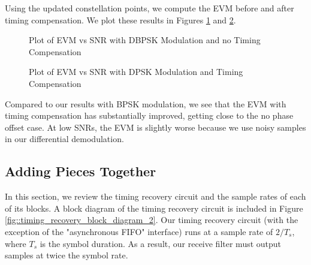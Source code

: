 \documentclass{article}
\begin{document}
\noindent Using the updated constellation points, we compute the EVM before and after timing compensation. We plot these results in Figures \ref{fig::evm_vs_snr_dbpsk_no_comp} and \ref{fig::evm_vs_snr_dbpsk}.

\begin{figure}[H]
	\centerline{}
	\caption{Plot of EVM vs SNR with DBPSK Modulation and no Timing Compensation}
	\label{fig::evm_vs_snr_dbpsk_no_comp}
\end{figure}

\begin{figure}[H]
	\centerline{}
	\caption{Plot of EVM vs SNR with DPSK Modulation and Timing Compensation}
	\label{fig::evm_vs_snr_dbpsk}
\end{figure}

Compared to our results with BPSK modulation, we see that the EVM with timing compensation has substantially improved, getting close to the no phase offset case. At low SNRs, the EVM is slightly worse because we use noisy samples in our differential demodulation.

\subsection{Adding Pieces Together}
\label{section::adding_pieces_together}

In this section, we review the timing recovery circuit and the sample rates of each of its blocks. A block diagram of the timing recovery circuit is included in Figure \ref{fig::timing_recovery_block_diagram_2}. Our timing recovery circuit (with the exception of the "asynchronous FIFO" interface) runs at a sample rate of $2/T_s$, where $T_s$ is the symbol duration. As a result, our receive filter must output samples at twice the symbol rate.
\end{document}
